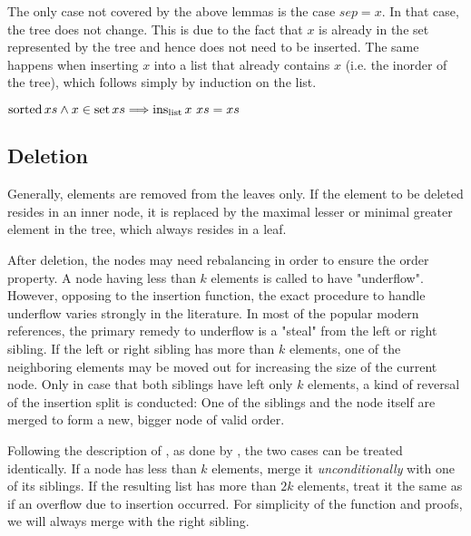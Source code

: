 The only case not covered by the above lemmas is the case $sep = x$.
In that case, the tree does not change.
This is due to the fact that $x$ is already in the set represented by the tree
and hence does not need to be inserted.
The same happens when inserting $x$ into a list that already contains $x$
(i.e. the inorder of the tree),
which follows simply by induction on the list.

\begin{lemma}
    $\operatorname{sorted} xs \wedge x \in \operatorname{set} xs \Longrightarrow \operatorname{ins_{list}} x\ xs = xs$
\end{lemma}

\subsection{Deletion}

Generally, elements are removed from the leaves only.
If the element to be deleted resides in an inner node,
it is replaced by the maximal lesser or minimal greater
element in the tree, which always resides in a leaf.

After deletion, the nodes may need rebalancing in order
to ensure the order property.
A node having less than $k$ elements is called to have "underflow".
However, opposing to the insertion function,
the exact procedure to handle underflow varies strongly in the literature.
In most of the popular modern references, %
the primary remedy to underflow is a "steal"
from the left or right sibling.\parencite{DBLP:books/daglib/0023376}
If the left or right sibling has more than $k$ elements,
one of the neighboring elements may be moved out for increasing
the size of the current node.
Only in case that both siblings have left only $k$ elements,
a kind of reversal of the insertion split is conducted:
One of the siblings and the node itself are merged to form
a new, bigger node of valid order.

Following the description of \parencite{DBLP:journals/acta/BayerM72},
as done by \parencite{Fielding80},
the two cases can be treated identically.
If a node has less than $k$ elements,
merge it \textit{unconditionally} with one of its siblings.
If the resulting list has more than $2k$ elements,
treat it the same as if an overflow due to insertion occurred.
For simplicity of the function and proofs, we will always
merge with the right sibling.


